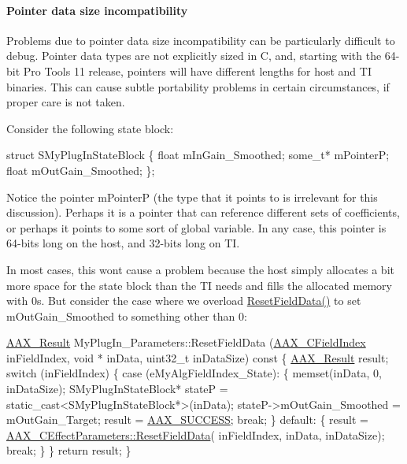 \hypertarget{a00362_subsubsection__pointer_data_size_incompatibility}{}\paragraph{Pointer data size incompatibility}\label{a00362_subsubsection__pointer_data_size_incompatibility}
Problems due to pointer data size incompatibility can be particularly difficult to debug. Pointer data types are not explicitly sized in C, and, starting with the 64-\/bit Pro Tools 11 release, pointers will have different lengths for host and T\+I binaries. This can cause subtle portability problems in certain circumstances, if proper care is not taken.

Consider the following state block\+:


\begin{DoxyCode}
\textcolor{keyword}{struct }SMyPlugInStateBlock
\{
     \textcolor{keywordtype}{float} mInGain\_Smoothed;
     some\_t* mPointerP;
     \textcolor{keywordtype}{float} mOutGain\_Smoothed;
\};
\end{DoxyCode}


Notice the pointer {\ttfamily m\+Pointer\+P} (the type that it points to is irrelevant for this discussion). Perhaps it is a pointer that can reference different sets of coefficients, or perhaps it points to some sort of global variable. In any case, this pointer is 64-\/bits long on the host, and 32-\/bits long on T\+I.

In most cases, this won\textquotesingle{}t cause a problem because the host simply allocates a bit more space for the state block than the T\+I needs and fills the allocated memory with 0s. But consider the case where we overload \hyperlink{a00018_accef965824c9b158cafb65e59e216b6a}{Reset\+Field\+Data()} to set {\ttfamily m\+Out\+Gain\+\_\+\+Smoothed} to something other than 0\+:


\begin{DoxyCode}
\hyperlink{a00149_a4d8f69a697df7f70c3a8e9b8ee130d2f}{AAX\_Result} MyPlugIn\_Parameters::ResetFieldData (\hyperlink{a00149_ae807f8986143820cfb5d6da32165c9c7}{AAX\_CFieldIndex} inFieldIndex, \textcolor{keywordtype}{void}
       * inData, uint32\_t inDataSize)\textcolor{keyword}{ const}
\textcolor{keyword}{}\{
     \hyperlink{a00149_a4d8f69a697df7f70c3a8e9b8ee130d2f}{AAX\_Result} result;
     \textcolor{keywordflow}{switch} (inFieldIndex)
     \{
        \textcolor{keywordflow}{case} (eMyAlgFieldIndex\_State):
        \{
            memset(inData, 0, inDataSize);
            SMyPlugInStateBlock* stateP = \textcolor{keyword}{static\_cast<}SMyPlugInStateBlock*\textcolor{keyword}{>}(inData);
            stateP->mOutGain\_Smoothed = mOutGain\_Target;
            result = \hyperlink{a00207_a5f8c7439f3a706c4f8315a9609811937aeddbd1bb67e3a66e6af54a4b4a7a57b3}{AAX\_SUCCESS};
            \textcolor{keywordflow}{break};
        \}
        \textcolor{keywordflow}{default}:
        \{
            result = \hyperlink{a00018_accef965824c9b158cafb65e59e216b6a}{AAX\_CEffectParameters::ResetFieldData}(
      inFieldIndex, inData, inDataSize);
            \textcolor{keywordflow}{break};
        \}
     \}
     \textcolor{keywordflow}{return} result;
\}
\end{DoxyCode}


